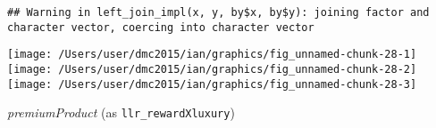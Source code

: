 \documentclass[10pt]{report}
\newenvironment{Shaded}{}{}
\newcommand{\KeywordTok}[1]{\textcolor[rgb]{0.00,0.44,0.13}{\textbf{{#1}}}}
\newcommand{\DataTypeTok}[1]{\textcolor[rgb]{0.56,0.13,0.00}{{#1}}}
\newcommand{\StringTok}[1]{\textcolor[rgb]{0.25,0.44,0.63}{{#1}}}
\newcommand{\NormalTok}[1]{{#1}}
\begin{document}
\begin{Shaded}
\end{Shaded}

\begin{verbatim}
## Warning in left_join_impl(x, y, by$x, by$y): joining factor and character vector, coercing into character vector
\end{verbatim}

\begin{Shaded}
\end{Shaded}

\begin{center}\texttt{[image: /Users/user/dmc2015/ian/graphics/fig\_unnamed-chunk-28-1]} \texttt{[image: /Users/user/dmc2015/ian/graphics/fig\_unnamed-chunk-28-2]} \texttt{[image: /Users/user/dmc2015/ian/graphics/fig\_unnamed-chunk-28-3]} \end{center}

\emph{premiumProduct} (as \texttt{llr\_rewardXluxury})
\end{document}
